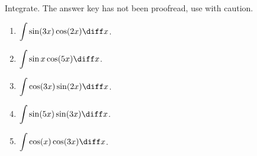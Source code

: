 Integrate. The answer key has not been proofread, use with caution.
\begin{enumerate}[ref={\fcProblemRef}]
\item $\displaystyle \int \sin (3 x) \cos (2x)\diff x$.

\item $\displaystyle \int \sin x \cos (5x)\diff x$.

\item $\displaystyle \int \cos (3x) \sin (2x)\diff x$.

\item $\displaystyle \int \sin (5x) \sin (3x)\diff x$.

\item $\displaystyle \int \cos (x) \cos (3x)\diff x$.

\end{enumerate}
